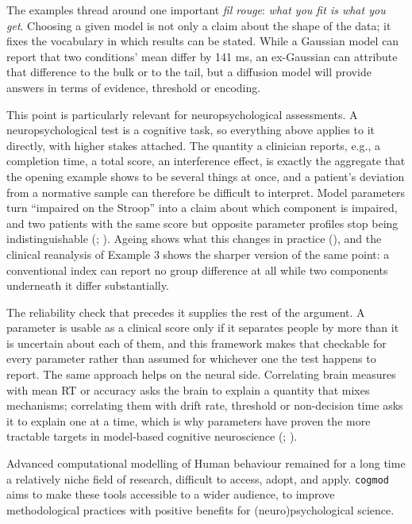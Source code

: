 \documentclass[
  jou,
  floatsintext,
  longtable,
  nolmodern,
  notxfonts,
  notimes,
  12pt,
  colorlinks=true,linkcolor=blue,citecolor=blue,urlcolor=blue]{apa7}
\begin{document}
The examples thread around one important \emph{fil rouge}: \emph{what
you fit is what you get}. Choosing a given model is not only a claim
about the shape of the data; it fixes the vocabulary in which results
can be stated. While a Gaussian model can report that two conditions'
mean differ by 141 ms, an ex-Gaussian can attribute that difference to
the bulk or to the tail, but a diffusion model will provide answers in
terms of evidence, threshold or encoding.

This point is particularly relevant for neuropsychological assessments.
A neuropsychological test is a cognitive task, so everything above
applies to it directly, with higher stakes attached. The quantity a
clinician reports, e.g., a completion time, a total score, an
interference effect, is exactly the aggregate that the opening example
shows to be several things at once, and a patient's deviation from a
normative sample can therefore be difficult to interpret. Model
parameters turn ``impaired on the Stroop'' into a claim about which
component is impaired, and two patients with the same score but opposite
parameter profiles stop being indistinguishable
(; ).
Ageing shows what this changes in practice
(), and the clinical
reanalysis of Example 3 shows the sharper version of the same point: a
conventional index can report no group difference at all while two
components underneath it differ substantially.

The reliability check that precedes it supplies the rest of the
argument. A parameter is usable as a clinical score only if it separates
people by more than it is uncertain about each of them, and this
framework makes that checkable for every parameter rather than assumed
for whichever one the test happens to report. The same approach helps on
the neural side. Correlating brain measures with mean RT or accuracy
asks the brain to explain a quantity that mixes mechanisms; correlating
them with drift rate, threshold or non-decision time asks it to explain
one at a time, which is why parameters have proven the more tractable
targets in model-based cognitive neuroscience
(;
).

Advanced computational modelling of Human behaviour remained for a long
time a relatively niche field of research, difficult to access, adopt,
and apply. \texttt{cogmod} aims to make these tools accessible to a
wider audience, to improve methodological practices with positive
benefits for (neuro)psychological science.
\end{document}
